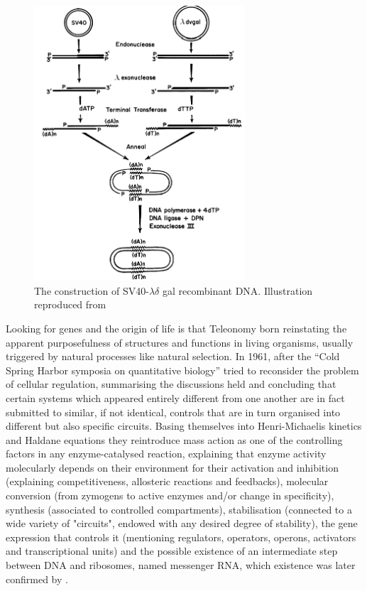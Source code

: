 \begin{figure}[!ht]
  \centering
  \includegraphics[width=0.7\textwidth]{introduction/chapter/figs/cohen.png}
  \caption{The construction of SV40-$\lambda\delta$ gal recombinant DNA. Illustration reproduced from \citet{berg1981dissections}}
  \label{fig.intro5}
\end{figure}

Looking for genes and the origin of life is that Teleonomy born reinstating the apparent purposefulness of structures and functions in living organisms, usually triggered by natural processes like natural selection. In 1961, after the “Cold Spring Harbor symposia on quantitative biology” \citet{monod1961general} tried to reconsider the problem of cellular regulation, summarising the discussions held and concluding that certain systems which appeared entirely different from one another are in fact submitted to similar, if not identical, controls that are in turn organised into different but also specific circuits. Basing themselves into Henri-Michaelis kinetics and Haldane equations they reintroduce mass action as one of the controlling factors in any enzyme-catalysed reaction, explaining that enzyme activity molecularly depends on their environment for their activation and inhibition (explaining competitiveness, allosteric reactions and feedbacks), molecular conversion (from zymogens to active enzymes and/or change in specificity), synthesis (associated to controlled compartments), stabilisation (connected to a wide variety of "circuits", endowed with any desired degree of stability), the gene expression that controls it (mentioning regulators, operators, operons, activators and transcriptional units) and the possible existence of an intermediate step between DNA and ribosomes, named messenger RNA, which existence was later confirmed by \citet{hurwitz1963role}. 


